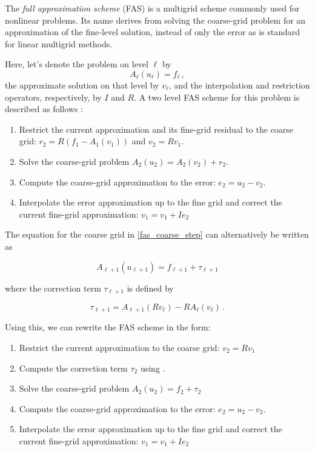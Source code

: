 The \textit{full approximation scheme} (FAS) is a multigrid scheme commonly used for nonlinear problems. Its name derives from solving the coarse-grid problem for an approximation of the fine-level solution, instead of only the error as is standard for linear multigrid methods. 

Here, let's denote the problem on level \(\ell\) by
\begin{equation}
    A_\ell(u_\ell)=f_\ell\,,
    \label{eq:fas_l_eq}
\end{equation}
the approximate solution on that level by \(v_\ell\), and the interpolation and restriction operators, respectively, by \(I\) and \(R\). A two level FAS scheme for this problem is described as follows \cite{briggs2000multigrid}:

\begin{enumerate}
    \item Restrict the current approximation and its fine-grid residual to the coarse grid: \(r_2 = R(f_1 - A_1(v_1))\) and \(v_2 = R v_1\).
    \item \label{fas_coarse_step} Solve the coarse-grid problem \(A_2(u_2) = A_2(v_2) + r_2\).
    \item Compute the coarse-grid approximation to the error: \(e_2 = u_2 - v_2\).
    \item Interpolate the error approximation up to the fine grid and correct the current fine-grid approximation: \(v_1 = v_1 + Ie_2\)
\end{enumerate}

The equation for the coarse grid in \ref{fas_coarse_step} can alternatively be written as

\begin{equation}
    A_{\ell+1}(u_{\ell+1})=f_{\ell+1}+\tau_{\ell+1}
    \label{eq:fas_lp1_eq}
\end{equation}

where the correction term \(\tau_{\ell+1}\) is defined by

\begin{equation}
    \tau_{\ell+1}=A_{\ell+1}(Rv_{\ell})-RA_\ell(v_\ell)\,.
    \label{eq:fas_tau}
\end{equation}

Using this, we can rewrite the FAS scheme in the form:

\begin{enumerate}
    \item Restrict the current approximation to the coarse grid: \(v_2 = R v_1\)
    \item Compute the correction term \(\tau_2\) using .
    \item Solve the coarse-grid problem \(A_2(u_2)=f_2+\tau_2\)
    \item Compute the coarse-grid approximation to the error: \(e_2 = u_2 - v_2\).
    \item Interpolate the error approximation up to the fine grid and correct the current fine-grid approximation: \(v_1 = v_1 + Ie_2\)
\end{enumerate}

